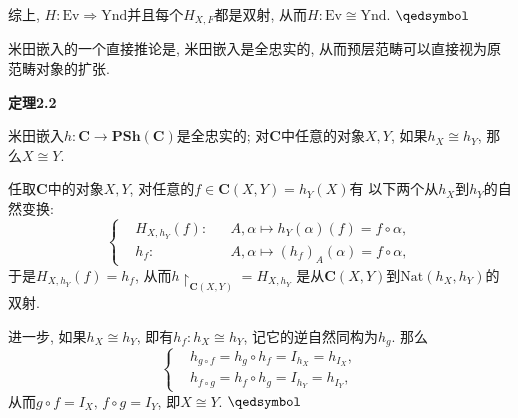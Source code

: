 \documentclass[UTF8]{ctexart}
\begin{document}
综上, $H:\mathrm{Ev}\Rightarrow\mathrm{Ynd}$并且每个$H_{X,F}$都是双射,
从而$H:\mathrm{Ev}\cong\mathrm{Ynd}$. \hfill $\qedsymbol$

\vspace{10pt}

米田嵌入的一个直接推论是, 米田嵌入是全忠实的, 从而预层范畴可以直接视为原范畴对象的扩张.

\vspace{10pt}

\hypertarget{sec:定理2.2}{}
\noindent\textbf{定理2.2}

米田嵌入$h:\mathbf{C}\to\mathbf{PSh}(\mathbf{C})$是全忠实的;
对$\mathbf{C}$中任意的对象$X,Y$, 如果$h_X\cong h_Y$, 那么$X\cong Y$.


任取$\mathbf{C}$中的对象$X,Y$, 对任意的$f\in\mathbf{C}(X,Y)=h_Y(X)$有
以下两个从$h_X$到$h_Y$的自然变换:
\[\left\{\begin{aligned}
    &H_{X,h_Y}(f):&&A,\alpha\mapsto h_Y(\alpha)(f)=f\circ\alpha,\\[-3pt]
    &h_f:&&A,\alpha\mapsto(h_f)_A(\alpha)=f\circ\alpha,
\end{aligned}\right.\]
于是$H_{X,h_Y}(f)=h_f$, 从而$h\!\restriction_{\mathbf{C}(X,Y)}=H_{X,h_Y}$
是从$\mathbf{C}(X,Y)$到$\mathrm{Nat}(h_X,h_Y)$的双射.

进一步, 如果$h_X\cong h_Y$, 即有$h_f:h_X\cong h_Y$, 记它的逆自然同构为$h_g$. 那么
\[\left\{\begin{aligned}
    &h_{g\circ f}=h_g\circ h_f=I_{h_X}=h_{I_X},\\[-3pt]
    &h_{f\circ g}=h_f\circ h_g=I_{h_Y}=h_{I_Y},
\end{aligned}\right.\]
从而$g\circ f=I_X,\,f\circ g=I_Y$, 即$X\cong Y$. \hfill $\qedsymbol$
\end{document}
